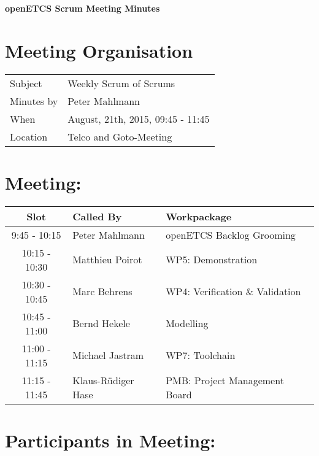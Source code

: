 \documentclass[a4paper, 11pt]{article}
\begin{document}
{\begin{center}\huge\bf openETCS Scrum Meeting Minutes\end{center}}
\section{Meeting Organisation}

\renewcommand{\arraystretch}{1.5}
\begin{supertabular}{m{.2\textwidth}m{.8\textwidth}}
Subject & Weekly Scrum of Scrums\\
Minutes by & Peter Mahlmann\\
When & August, 21th, 2015, 09:45 - 11:45\\
Location & Telco and Goto-Meeting\\
\end{supertabular}

\renewcommand{\arraystretch}{1.0}
\section{Meeting:}

\begin{tabular}{|c|l|l|}
\hline
\textbf{Slot} &  \textbf{Called By} & \textbf{Workpackage} \\
\hline  
9:45 - 10:15 & Peter Mahlmann & openETCS Backlog Grooming  \\\hline
10:15 - 10:30 & Matthieu Poirot & WP5: Demonstration \\\hline  
10:30 - 10:45 & Marc Behrens & WP4: Verification \& Validation \\\hline 
10:45 - 11:00 & Bernd Hekele & Modelling \\\hline
11:00 - 11:15 & Michael Jastram  & WP7: Toolchain \\\hline
11:15 - 11:45 & Klaus-R\"udiger Hase & PMB: Project Management Board \\\hline  
\end{tabular}

\section{Participants in Meeting:}
\end{document}
